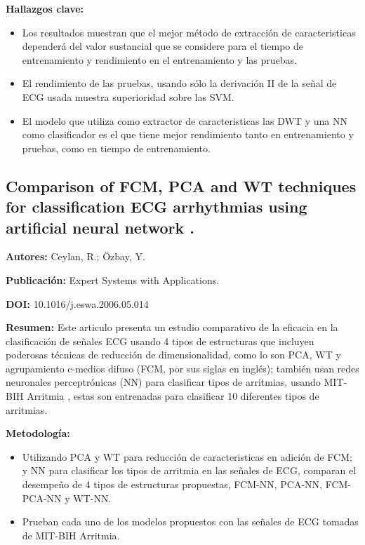 \documentclass[12pt,letterpaper,oneside,openright]{book}
\begin{document}
\textbf{Hallazgos clave:}
\begin{itemize}
	\item Los resultados muestran que el mejor método de extracción de caracteristicas dependerá del valor sustancial que se considere para el tiempo de entrenamiento y rendimiento en el entrenamiento y las pruebas.
	\item El rendimiento de las pruebas, usando sólo la derivación II de la señal de ECG usada muestra superioridad sobre las SVM.
	\item El modelo que utiliza como extractor de caracteristicas las DWT y una NN como clasificador es el que tiene mejor rendimiento tanto en entrenamiento y pruebas, como en tiempo de entrenamiento.
\end{itemize}

\subsection{Comparison of FCM, PCA and WT techniques for classification ECG arrhythmias using artificial neural network \cite{Ceylan07}.}

\textbf{Autores:} Ceylan, R.; Özbay, Y.

\textbf{Publicación:} Expert Systems with Applications.

\textbf{DOI:} 10.1016/j.eswa.2006.05.014

\textbf{Resumen:} Este articulo presenta un estudio comparativo de la eficacia en la clasificación de señales ECG usando 4 tipos de estructuras que incluyen poderosas técnicas de reducción de dimensionalidad, como lo son PCA, WT y agrupamiento c-medios difuso (FCM, por sus siglas en inglés); también usan redes neuronales perceptrónicas (NN) para clasificar tipos de arritmias, usando MIT-BIH Arritmia \cite{arritmiadb}, estas son entrenadas para clasificar 10 diferentes tipos de arritmias. 

\textbf{Metodología:}
\begin{itemize}
	\item Utilizando PCA y WT para reducción de caracteristicas en adición de FCM; y NN para clasificar los tipos de arritmia en las señales de ECG, comparan el desempeño de 4 tipos de estructuras propuestas, FCM-NN, PCA-NN, FCM-PCA-NN y WT-NN.
	\item Prueban cada uno de los modelos propuestos con las señales de ECG tomadas de MIT-BIH Arritmia\cite{arritmiadb}.
\end{itemize}
\end{document}
